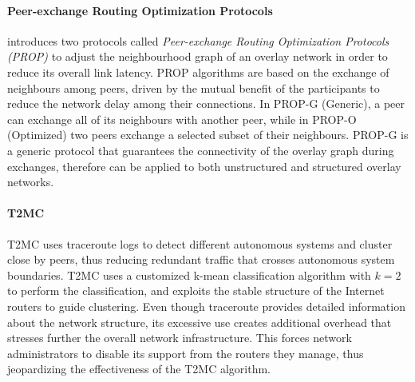 

\paragraph*{\bf Peer-exchange Routing Optimization Protocols}
\cite{qiu_prop_2007} introduces two protocols called \emph{Peer-exchange Routing
Optimization Protocols (PROP)} to adjust the neighbourhood graph of an overlay
network in order to reduce its overall link latency. PROP algorithms are based
on the exchange of neighbours among peers, driven by the mutual benefit of the
participants to reduce the network delay among their connections.  In PROP-G
(Generic), a peer can exchange all of its neighbours with another peer, while in
PROP-O (Optimized) two peers exchange a selected subset of their neighbours.
PROP-G is a generic protocol that guarantees the connectivity of the overlay
graph during exchanges, therefore can be applied to both unstructured and
structured overlay networks.

\paragraph*{\bf T2MC}
T2MC \cite{shi_t2mc_2008} uses traceroute logs to detect different autonomous
systems and cluster close by peers, thus reducing redundant traffic that crosses
autonomous system boundaries. T2MC uses a customized k-mean classification
algorithm with $k=2$ to perform the classification, and exploits the stable
structure of the Internet routers to guide clustering. Even though traceroute
provides detailed information about the network structure, its excessive use
creates additional overhead that stresses further the overall network
infrastructure. This forces network administrators to disable its support from
the routers they manage, thus jeopardizing the effectiveness of the T2MC
algorithm.

